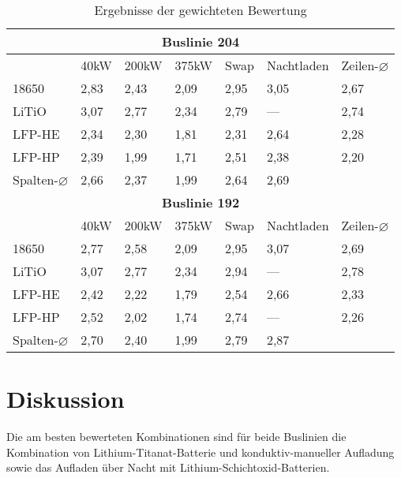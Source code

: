 \begin{table}
	\centering
	\begin{tabular}{lllllll}
		                       \multicolumn{7}{c}{\textbf{Buslinie 204}}                        \\ \toprule
		                      & 40kW & 200kW & 375kW & Swap & Nachtladen & Zeilen-$\varnothing$ \\ \midrule
		18650                 & 2,83 & 2,43  & 2,09  & 2,95 & 3,05       & 2,67                 \\
		LiTiO                 & 3,07 & 2,77  & 2,34  & 2,79 & ---        & 2,74                 \\
		LFP-HE                & 2,34 & 2,30  & 1,81  & 2,31 & 2,64       & 2,28                 \\
		LFP-HP                & 2,39 & 1,99  & 1,71  & 2,51 & 2,38       & 2,20                 \\
		Spalten-$\varnothing$ & 2,66 & 2,37  & 1,99  & 2,64 & 2,69       &  \\ \midrule
		                       \multicolumn{7}{c}{\textbf{Buslinie 192}}                        \\
		                      & 40kW & 200kW & 375kW & Swap & Nachtladen & Zeilen-$\varnothing$ \\ \midrule
		18650                 & 2,77 & 2,58  & 2,09  & 2,95 & 3,07       & 2,69                 \\
		LiTiO                 & 3,07 & 2,77  & 2,34  & 2,94 & ---        & 2,78                 \\
		LFP-HE                & 2,42 & 2,22  & 1,79  & 2,54 & 2,66       & 2,33                 \\
		LFP-HP                & 2,52 & 2,02  & 1,74  & 2,74 & ---        & 2,26                 \\
		Spalten-$\varnothing$ & 2,70 & 2,40  & 1,99  & 2,79 & 2,87       &  \\ \bottomrule
	\end{tabular}
	\caption{Ergebnisse der gewichteten Bewertung}
	\label{tab_ergebnisse}
\end{table} 

\section{Diskussion} 
Die am besten bewerteten Kombinationen sind für beide Buslinien die Kombination von Lithium-Titanat-Batterie und konduktiv-manueller Aufladung sowie das Aufladen über Nacht mit Lithium-Schichtoxid-Batterien.

